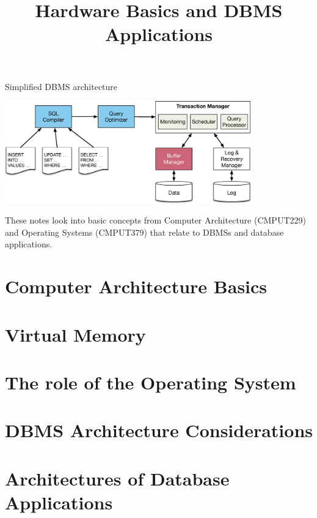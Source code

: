 \documentclass[xcolor={usenames,dvipsnames}
    ,handout
]{beamer}
\title{Hardware Basics and DBMS Applications}
\begin{document}



\frame{\maketitle}

%
%
\begin{frame}{Simplified DBMS architecture}

\begin{center}
\includegraphics[width=0.8\textwidth]{../lec00_intro/figures/dbms_architecture}
\end{center}

These notes look into basic concepts from Computer Architecture (CMPUT229) and Operating Systems (CMPUT379) that relate to DBMSs and database applications.

\end{frame}

\tableofcontents

%
%
\section{Computer Architecture Basics}


%
%
\section{Virtual Memory}


%
%
\section{The role of the Operating System}


%
%
\section{DBMS Architecture Considerations}


%
%
\section{Architectures of Database \textbf{Applications}}

\end{document}
